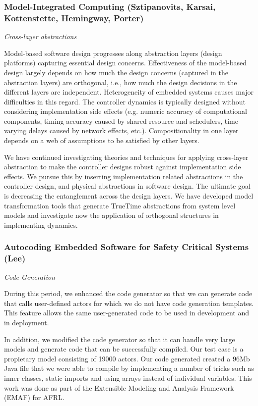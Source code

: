 \subsubsection{Model-Integrated Computing (Sztipanovits, Karsai, Kottenstette, Hemingway, Porter)}

\emph{Cross-layer abstractions}

Model-based software design progresses along abstraction layers
(design platforms) capturing essential design concerns. Effectiveness of the model-based design
largely depends on how much the design concerns (captured in the abstraction layers) are orthogonal,
i.e., how much the design decisions in the different layers are independent. Heterogeneity
of embedded systems causes major difficulties in this regard. The controller dynamics is typically
designed without considering implementation side effects (e.g. numeric accuracy of computational
components, timing accuracy caused by shared resource and schedulers, time varying delays
caused by network effects, etc.). Compositionality in one layer depends on a web of assumptions
to be satisfied by other layers.

We have continued investigating theories and techniques for applying cross-layer abstraction
to make the controller designs robust against implementation side effects. We pursue this by inserting
implementation related abstractions in the controller design, and physical abstractions in
software design. The ultimate goal is decreasing the entanglement across the design layers.
We have developed model transformation tools that generate TrueTime abstractions from system
level models and investigate now the application of orthogonal structures in implementing
dynamics.


              \subsubsection{Autocoding Embedded Software for Safety Critical Systems (Lee)} 


               \emph{Code Generation}
               
               During this period, we enhanced the code generator so
               that we can generate code that calls user-defined actors
               for which we do not have code generation templates.  This
               feature allows the same user-generated code to be used in
               development and in deployment.

               In addition, we modified the code generator so that it can handle very
               large models and generate code that can be successfully compiled.  Our
               test case is a propietary model consisting of 19000 actors.  Our code
               generated created a 96Mb Java file that we were able to compile by
               implementing a number of tricks such as inner classes, static imports
               and using arrays instead of individual variables.  This work was done
               as part of the Extensible Modeling and Analysis Framework (EMAF) for
               AFRL.


